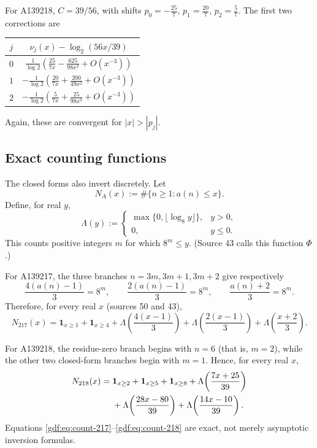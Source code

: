\documentclass[11pt,a4paper]{article}
\numberwithin{equation}{section}
\theoremstyle{definition}
\theoremstyle{remark}
\theoremstyle{plain}
\newcommand{\ind}{\mathbf 1}
\begin{document}
For A139218, $C=39/56$, with shifts $p_0=-\frac{25}{7}$, $p_1=\frac{20}{7}$,
$p_2=\frac{5}{7}$.  The first two corrections are
\begin{center}
\begin{tabular}{c c}
\toprule
$j$ & $\nu_j(x)-\log_2(56x/39)$\\
\midrule
$0$ & $\displaystyle \frac1{\log2}\left(\frac{25}{7x}-\frac{625}{98x^2}+O(x^{-3})\right)$\\[0.8em]
$1$ & $\displaystyle -\frac1{\log2}\left(\frac{20}{7x}+\frac{200}{49x^2}+O(x^{-3})\right)$\\[0.8em]
$2$ & $\displaystyle -\frac1{\log2}\left(\frac{5}{7x}+\frac{25}{98x^2}+O(x^{-3})\right)$\\
\bottomrule
\end{tabular}
\end{center}
Again, these are convergent for $|x|>|p_j|$.

\subsection{Exact counting functions}\label{gdf:sec:counting}

The closed forms also invert discretely.  Let
\[
 N_A(x):=\#\{n\ge1:a(n)\le x\}.
\]
Define, for real $y$,
\begin{equation}\label{gdf:eq:Lambda-def}
 \Lambda(y):=
 \begin{cases}
 \max\{0,\lfloor\log_8 y\rfloor\},&y>0,\\
 0,&y\le0.
 \end{cases}
\end{equation}
This counts positive integers $m$ for which $8^m\le y$.  (Source 43 calls this
function $\Phi$.)

For A139217, the three branches $n=3m,3m+1,3m+2$ give respectively
\[
 \frac{4(a(n)-1)}3=8^m,\qquad
 \frac{2(a(n)-1)}3=8^m,\qquad
 \frac{a(n)+2}3=8^m.
\]
Therefore, for every real $x$ (sources 50 and 43),
\begin{equation}\label{gdf:eq:count-217}
 \boxed{
 N_{217}(x)=\ind_{x\ge1}+\ind_{x\ge4}
 +\Lambda\!\left(\frac{4(x-1)}3\right)
 +\Lambda\!\left(\frac{2(x-1)}3\right)
 +\Lambda\!\left(\frac{x+2}3\right).}
\end{equation}

For A139218, the residue-zero branch begins with $n=6$ (that is, $m=2$),
while the other two closed-form branches begin with $m=1$.  Hence, for every
real $x$,
\begin{align}
 N_{218}(x)={}&\ind_{x\ge2}+\ind_{x\ge5}+\ind_{x\ge8}
 +\Lambda\!\left(\frac{7x+25}{39}\right)\notag\\
 &+\Lambda\!\left(\frac{28x-80}{39}\right)
 +\Lambda\!\left(\frac{14x-10}{39}\right).
 \label{gdf:eq:count-218}
\end{align}
Equations \eqref{gdf:eq:count-217}--\eqref{gdf:eq:count-218} are exact, not merely
asymptotic inversion formulas.
\end{document}
